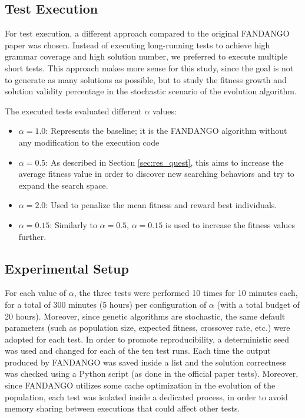 \documentclass[conference]{IEEEtran}
\begin{document}
\subsection{Test Execution}
For test execution, a different approach compared to the original FANDANGO paper was chosen. Instead of executing long-running tests to achieve high grammar coverage and high solution number, we preferred to execute multiple short tests. This approach makes more sense for this study, since the goal is not to generate as many solutions as possible, but to study the fitness growth and solution validity percentage in the stochastic scenario of the evolution algorithm.

The executed tests evaluated different $\alpha$ values:
\begin{itemize}
\item $\alpha = 1.0$: Represents the baseline; it is the FANDANGO algorithm without any modification to the execution code
\item $\alpha = 0.5$: As described in Section \ref{sec:res_quest}, this aims to increase the average fitness value in order to discover new searching behaviors and try to expand the search space.
\item $\alpha = 2.0$: Used to penalize the mean fitness and reward best individuals.
\item $\alpha = 0.15$: Similarly to $\alpha = 0.5$, $\alpha=0.15$ is used to increase the fitness values further.
\end{itemize}


\subsection{Experimental Setup}
For each value of $\alpha$,  the three tests were performed 10 times for 10 minutes each, for a total of 300 minutes (5 hours) per configuration of $\alpha$ (with a total budget of 20 hours). Moreover, since genetic algorithms are stochastic, the same default parameters (such as population size, expected fitness, crossover rate, etc.) were adopted for each test.
In order to promote reproducibility, a deterministic seed was used and changed for each of the ten test runs.
Each time the output produced by FANDANGO was saved inside a list and the solution correctness was checked using a Python script (as done in the official paper tests).
Moreover, since FANDANGO utilizes some cache optimization in the evolution of the population, each test was isolated inside a dedicated process, in order to avoid memory sharing between executions that could affect other tests. 
\end{document}
